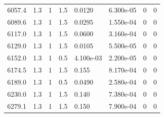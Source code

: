 \documentclass[preview]{standalone}
\begin{document}
{{{\begin{tabular}{L{1.2cm}C{1.2cm} C{0.3cm}C{0.5cm} C{1.4cm}C{1.4cm} C{1.4cm}C{1.4cm}}
  6057.4  &   1.3  & 1     & 1.5 &  0.0120  & 6.300e-05  & 0 &  0   \\ 
  6089.6  &   1.3  & 1     & 1.5 &  0.0295  & 1.550e-04  & 0 &  0   \\ 
  6117.0  &   1.3  & 1     & 1.5 &  0.0600  & 3.160e-04  & 0 &  0   \\ 
  6129.0  &   1.3  & 1     & 1.5 &  0.0105  & 5.500e-05  & 0 &  0   \\ 
  6152.0  &   1.3  & 1     & 0.5 &  4.100e-03  & 2.200e-05  & 0 &  0   \\ 
  6174.5  &   1.3  & 1     & 1.5 &  0.155  & 8.170e-04  & 0 &  0   \\ 
  6189.0  &   1.3  & 1     & 0.5 &  0.0490  & 2.580e-04  & 0 &  0   \\ 
  6230.0  &   1.3  & 1     & 1.5 &  0.140  & 7.380e-04  & 0 &  0   \\ 
  6279.1  &   1.3  & 1     & 1.5 &  0.150  & 7.900e-04  & 0 &  0   \\ 
\hline 
\end{tabular} 

}}}
\end{document}
